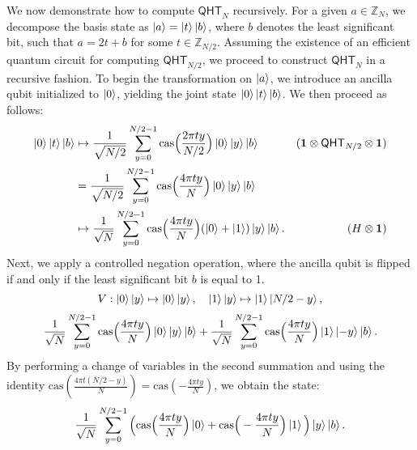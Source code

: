 \documentclass[12pt]{report}
\newcommand{\cas}{\mathrm{cas}}
\newcommand{\qht}{\mathsf{QHT}}
\begin{document}
We now demonstrate how to compute \( \qht_N \) recursively. For a given \( a \in \mathbb{Z}_N \), we decompose the basis state as \( \ket{a} = \ket{t}\ket{b} \), where \( b \) denotes the least significant bit, such that \( a = 2t + b \) for some \( t \in \mathbb{Z}_{N/2} \). Assuming the existence of an efficient quantum circuit for computing \( \qht_{N/2} \), we proceed to construct \( \qht_N \) in a recursive fashion. To begin the transformation on \( \ket{a} \), we introduce an ancilla qubit initialized to \( \ket{0} \), yielding the joint state \( \ket{0}\ket{t}\ket{b} \). We then proceed as follows:
\begin{align*}
	\ket{0}\ket{t}\ket{b}
    & \mapsto \frac{1}{\sqrt{N / 2}} \sum_{y = 0}^{N / 2 - 1} \cas\Big( \frac{2\pi t y}{N / 2} \Big) \ket{0} \ket{y} \ket{b} & (\mathbf{1} \otimes \qht_{N / 2} \otimes \mathbf{1}) \\
    & = \frac{1}{\sqrt{N / 2}} \sum_{y = 0}^{N / 2 - 1} \cas\Big( \frac{4\pi t y}{N} \Big) \ket{0} \ket{y} \ket{b} \\
    & \mapsto \frac{1}{\sqrt{N}} \sum_{y = 0}^{N / 2 - 1} \cas\Big( \frac{4\pi t y}{N} \Big) (\ket{0} + \ket{1}) \ket{y}\ket{b}. & (H \otimes \mathbf{1})
\end{align*}
Next, we apply a controlled negation operation, where the ancilla qubit is flipped if and only if the least significant bit \( b \) is equal to 1.
\[
    V: \ket{0}\ket{y} \mapsto \ket{0}\ket{y}, \quad \ket{1}\ket{y} \mapsto \ket{1}\ket{N / 2 -y},
\]
\[
    \frac{1}{\sqrt{N}} \sum_{y = 0}^{N / 2 - 1} \cas\Big( \frac{4\pi t y}{N} \Big) \ket{0} \ket{y} \ket{b} + \frac{1}{\sqrt{N}} \sum_{y = 0}^{N / 2 - 1} \cas\Big( \frac{4\pi t y}{N} \Big) \ket{1} \ket{-y} \ket{b}.
\]
By performing a change of variables in the second summation and using the identity \( \cas\left(\frac{4\pi t (N / 2 - y)}{N}\right) = \cas\left(-\frac{4\pi t y}{N}\right) \), we obtain the state:
\[
    \frac{1}{\sqrt{N}} \sum_{y = 0}^{N / 2 - 1} \Big( \cas\Big( \frac{4\pi t y}{N} \Big) \ket{0} + \cas\Big( -\frac{4\pi t y}{N} \Big) \ket{1} \Big) \ket{y} \ket{b}.
\]
\end{document}

